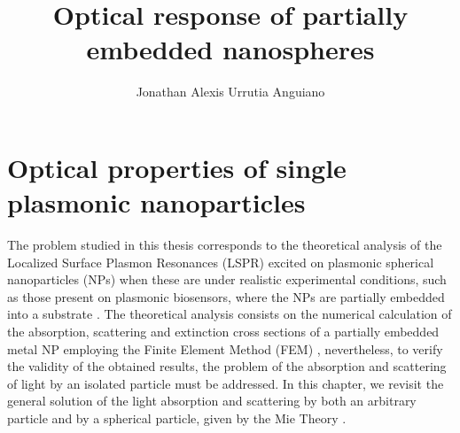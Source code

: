 \documentclass[11pt]{Latex/Classes/PhDthesisPSnPDF}
\author{Jonathan Alexis Urrutia Anguiano}
\title{Optical response of partially embedded nanospheres}
\begin{document}
%
\maketitle
\frontmatter

%
%
%


%
\setcounter{secnumdepth}{3} %
\setcounter{tocdepth}{3}    %

\tableofcontents            %



\mainmatter

\def\baselinestretch{1}                   %



\chapter{Optical properties of single plasmonic nanoparticles}
\label{chapter:OpticalProperties}

The problem studied in this thesis corresponds to the theoretical analysis of the Localized Surface Plasmon Resonances (LSPR)  excited on plasmonic spherical nanoparticles (NPs) when these are under realistic experimental conditions, such as those present on plasmonic biosensors, where the NPs are partially embedded into a substrate \cite{moirangthem_enhanced_2012}. The theoretical analysis consists on the numerical calculation of the absorption, scattering and extinction  cross sections of a partially embedded metal NP employing the Finite Element Method (FEM) , nevertheless, to verify the validity of the obtained results, the problem of the absorption and scattering of light by an isolated particle must be addressed. In this chapter, we revisit the general solution of the light absorption and scattering by both an arbitrary particle and by a spherical particle, given by the Mie Theory \cite{bohren_absorption_1983}.
\end{document}

